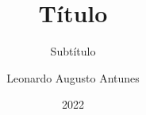 \documentclass{PTINew}
\author{Leonardo Augusto Antunes}
\title{Título}
\subtitle{Subtítulo}
\date{2022}
\begin{document}
    \cover
    \contents
    
    
    \biblio
    
    
\end{document}
